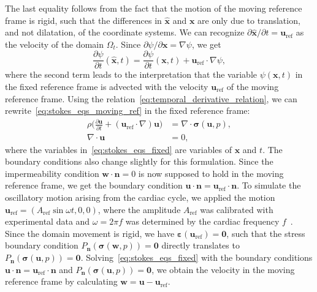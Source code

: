 \documentclass[fleqn]{wlscirep}
\newcommand{\pdifft}[1]{\frac{\partial  #1}{\partial t}}
\newcommand{\nn}{\mathbf{n}}
\newcommand{\uu}{\mathbf{u}}
\newcommand{\uuref}{\mathbf{u}_{\mathrm{ref}}}
\newcommand{\ww}{\mathbf{w}}
\newcommand{\xx}{\bm{x}}
\newcommand{\bsig}{\bm{\sigma}}
\newcommand{\beps}{\bm{\varepsilon}}
\begin{document}
The last equality follows from the fact that the motion of the moving reference frame is rigid, such that the differences in $\hat{\xx}$ and $\xx$ are only due to translation, and not dilatation, of the coordinate systems. We can recognize $\partial\hat{\xx}/\partial t = \uu_{\mathrm{ref}}$ as the velocity of the domain $\Omega_t$. Since $\partial\psi/\partial\xx = \nabla\psi$, we get
\begin{equation}
    \pdifft{\psi}(\hat{\xx}, t) = \pdifft{\psi}(\xx, t) + \uu_{\mathrm{ref}}\cdot\nabla\psi,
    \label{eq:temporal_derivative_relation}
\end{equation}
where the second term leads to the interpretation that the variable $\psi(\xx, t)$ in the fixed reference frame is advected with the velocity $\uu_{\mathrm{ref}}$ of the moving reference frame. Using the relation~\eqref{eq:temporal_derivative_relation}, we can rewrite~\eqref{eq:stokes_eqs_moving_ref} in the fixed reference frame:
\begin{subequations}
    \begin{alignat}{2}
        \rho\bigg(\pdifft{\uu} + (\uu_{\mathrm{ref}}\cdot\nabla)\uu\bigg) &= \nabla\cdot\bm{\sigma}(\uu, p), \label{eq:mom_eq_fixed}\\
        \nabla\cdot\uu &= 0,
    \end{alignat}
    \label{eq:stokes_eqs_fixed}%
\end{subequations}%
where the variables in~\eqref{eq:stokes_eqs_fixed} are variables of $\xx$ and $t$. The boundary conditions also change slightly for this formulation. Since the impermeability condition $\ww\cdot\nn=0$ is now supposed to hold in the moving reference frame, we get the boundary condition $\uu\cdot\nn = \uuref\cdot\nn$. To simulate the oscillatory motion arising from the cardiac cycle, we applied the motion $\uuref = (A_{\mathrm{ref}}\sin{\omega t}, 0, 0)$, where the amplitude $A_{\mathrm{ref}}$ was calibrated with experimental data and $\omega = 2\pi f$ was determined by the cardiac frequency $f$~\cite{Olstad2019CiliaryDevelopment}. Since the domain movement is rigid, we have $\beps(\uuref) = \mathbf{0}$, such that the stress boundary condition $P_{\nn}(\bsig(\ww, p)) = \mathbf{0}$ directly translates to $P_{\nn}(\bsig(\uu, p)) = \mathbf{0}$. Solving~\eqref{eq:stokes_eqs_fixed} with the boundary conditions $\uu\cdot\nn = \uuref\cdot\nn$ and $P_{\nn}(\bsig(\uu, p)) = \mathbf{0}$, we obtain the velocity in the moving reference frame by calculating $\ww = \uu - \uuref$.
\fi
\end{document}
